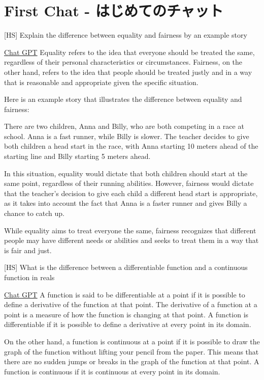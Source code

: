 \documentclass[
]{book}
\theoremstyle{definition}
\theoremstyle{definition}
\theoremstyle{definition}
\theoremstyle{definition}
\theoremstyle{remark}
\begin{document}
\hypertarget{firstchat}{%
\section{First Chat - はじめてのチャット　}\label{firstchat}}

{[}HS{]} Explain the difference between equality and fairness by an example story

\protect\hyperlink{chatgpt}{Chat GPT} Equality refers to the idea that everyone should be treated the same, regardless of their personal characteristics or circumstances. Fairness, on the other hand, refers to the idea that people should be treated justly and in a way that is reasonable and appropriate given the specific situation.

Here is an example story that illustrates the difference between equality and fairness:

There are two children, Anna and Billy, who are both competing in a race at school. Anna is a fast runner, while Billy is slower. The teacher decides to give both children a head start in the race, with Anna starting 10 meters ahead of the starting line and Billy starting 5 meters ahead.

In this situation, equality would dictate that both children should start at the same point, regardless of their running abilities. However, fairness would dictate that the teacher's decision to give each child a different head start is appropriate, as it takes into account the fact that Anna is a faster runner and gives Billy a chance to catch up.

While equality aims to treat everyone the same, fairness recognizes that different people may have different needs or abilities and seeks to treat them in a way that is fair and just.

{[}HS{]} What is the difference between a differentiable function and a continuous function in reals

\protect\hyperlink{chatgpt}{Chat GPT} A function is said to be differentiable at a point if it is possible to define a derivative of the function at that point. The derivative of a function at a point is a measure of how the function is changing at that point. A function is differentiable if it is possible to define a derivative at every point in its domain.

On the other hand, a function is continuous at a point if it is possible to draw the graph of the function without lifting your pencil from the paper. This means that there are no sudden jumps or breaks in the graph of the function at that point. A function is continuous if it is continuous at every point in its domain.
\end{document}
